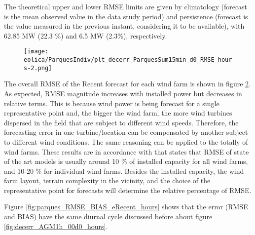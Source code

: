 The theoretical upper and lower RMSE limits are given by climatology (forecast is the mean observed value in the data study period) and persistence (forecast is the value measured in the previous instant, considering it to be available), with 62.85 MW (22.3 \%) and 6.5 MW (2.3\%), respectively.

\begin{figure}[!htp]
    \centering
    \texttt{[image: eolica/ParquesIndiv/plt\_decerr\_ParquesSum15min\_d0\_RMSE\_hours-2.png]}
  \label{fig:RMSE_d0}
\end{figure}
\FloatBarrier

The overall RMSE of the Recent forecast for each wind farm is shown in figure \ref{fig:parques_decerr_eRecent}. As expected, RMSE magnitude increases with installed power but decreases in relative terms. This is because wind power is being forecast for a single representative point and, the bigger the wind farm, the more wind turbines dispersed in the field that are subject to different wind speeds. Therefore, the forecasting error in one turbine/location can be compensated by another subject to different wind conditions. The same reasoning can be applied to the totally of wind farms. These results are in accordance with \cite{Foley2012} that states that RMSE of state of the art models is usually around 10 \% of installed capacity for all wind farms, and 10-20 \% for individual wind farms. Besides the installed capacity, the wind farm layout, terrain complexity in the vicinity, and the choice of the representative point for forecasts will determine the relative percentage of RMSE.

\begin{figure}[!htp]
    \centering
  \label{fig:parques_decerr_eRecent}
\end{figure}

Figure \ref{fig:parques_RMSE_BIAS_eRecent_hours} shows that the error (RMSE and BIAS) have the same diurnal cycle discussed before about figure \ref{fig:decerr_AGM1h_00d0_hours}.


